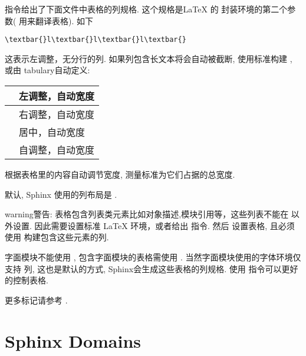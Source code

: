 \documentclass[letterpaper,10pt,english]{sphinxmanual}
\begin{document}
\begin{fulllineitems}
\label{markup/misc:directive-tabularcolumns}
指令给出了下面文件中表格的列规格.
这个规格是LaTeX 的  封装环境的第二个参数(  用来翻译表格).
如下

\begin{Verbatim}[commandchars=\\\{\}]
\textbar{}l\textbar{}l\textbar{}l\textbar{}
\end{Verbatim}

这表示左调整，无分行的列.  如果列包含长文本将会自动被截断,
使用标准构建  , 或由 tabulary自动定义:

\begin{tabulary}{\linewidth}{|L|L|}
\hline

 & 
左调整，自动宽度
\\
\hline
{}
 & 
右调整，自动宽度
\\
\hline
{}
 & 
居中，自动宽度
\\
\hline
{}
 & 
自调整，自动宽度
\\
\hline\end{tabulary}


根据表格里的内容自动调节宽度, 测量标准为它们占据的总宽度.

默认, Sphinx 使用的列布局是  .


\end{fulllineitems}


\begin{notice}{warning}{警告:}
表格包含列表类元素比如对象描述,模块引用等，这些列表不能在  以外设置.
因此需要设置标准 LaTeX  环境，或者给出  指令.
然后  设置表格, 且必须使用  构建包含这些元素的列.

字面模块不能使用  , 包含字面模块的表格需使用 .
当然字面模块使用的字体环境仅支持  列, 这也是默认的方式, Sphinx会生成这些表格的列规格.
使用 {\hyperref[markup/misc:directive\string-tabularcolumns]{}} 指令可以更好的控制表格.
\end{notice}

更多标记请参考 {\hyperref[domains:domains]{}}.


\chapter{Sphinx Domains}
\label{domains:standard-rest-markup}\label{domains:domains}\label{domains:sphinx-domains}\label{domains::doc}
\end{document}
